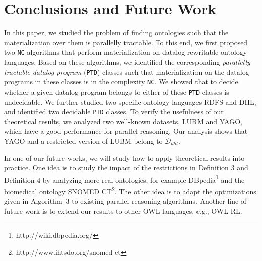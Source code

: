 \documentclass{article}
\begin{document}
\section{Conclusions and Future Work}

In this paper, we studied the problem of finding ontologies such that the materialization over them is parallelly tractable. To this end,
we first proposed two \texttt{NC} algorithms that perform materialization on datalog rewritable ontology languages.
Based on these algorithms, we identified the corresponding \emph{parallelly tractable datalog program} (\texttt{PTD}) classes such that materialization on the datalog programs in these classes is in the complexity \texttt{NC}.
We showed that to decide whether a given datalog program belongs to either of these \texttt{PTD} classes is undecidable. We further studied two specific ontology languages RDFS and DHL, and identified two decidable \texttt{PTD} classes. To verify the usefulness of our theoretical results, we analyzed two well-known datasets, LUBM and YAGO,
which have a good performance for parallel reasoning. Our analysis shows that YAGO and a
restricted version of LUBM belong to $\mathcal{D}_{dhl}$.

In one of our future works, we will study how to apply theoretical results into practice.
One idea is to study the impact of the restrictions in Definition 3 and Definition 4 by analyzing more real ontologies,
for example DBpedia\footnote{http://wiki.dbpedia.org/} and the biomedical ontology SNOMED CT\footnote{http://www.ihtsdo.org/snomed-ct}.
The other idea is to adapt the optimizations given in Algorithm~3 to existing parallel reasoning algorithms.
Another line of future work is to extend our results to other OWL languages, e.g., OWL RL.

\clearpage



\end{document}
